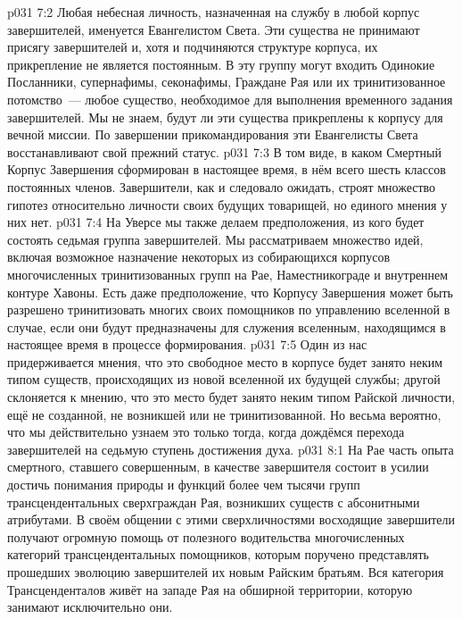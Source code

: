 \vs p031 7:2 Любая небесная личность, назначенная на службу в любой корпус завершителей, именуется Евангелистом Света. Эти существа не принимают присягу завершителей и, хотя и подчиняются структуре корпуса, их прикрепление не является постоянным. В эту группу могут входить Одинокие Посланники, супернафимы, секонафимы, Граждане Рая или их тринитизованное потомство~--- любое существо, необходимое для выполнения временного задания завершителей. Мы не знаем, будут ли эти существа прикреплены к корпусу для вечной миссии. По завершении прикомандирования эти Евангелисты Света восстанавливают свой прежний статус.
\vs p031 7:3 \pc В том виде, в каком Смертный Корпус Завершения сформирован в настоящее время, в нём всего шесть классов постоянных членов. Завершители, как и следовало ожидать, строят множество гипотез относительно личности своих будущих товарищей, но единого мнения у них нет.
\vs p031 7:4 На Уверсе мы также делаем предположения, из кого будет состоять седьмая группа завершителей. Мы рассматриваем множество идей, включая возможное назначение некоторых из собирающихся корпусов многочисленных тринитизованных групп на Рае, Наместникограде и внутреннем контуре Хавоны. Есть даже предположение, что Корпусу Завершения может быть разрешено тринитизовать многих своих помощников по управлению вселенной в случае, если они будут предназначены для служения вселенным, находящимся в настоящее время в процессе формирования.
\vs p031 7:5 Один из нас придерживается мнения, что это свободное место в корпусе будет занято неким типом существ, происходящих из новой вселенной их будущей службы; другой склоняется к мнению, что это место будет занято неким типом Райской личности, ещё не созданной, не возникшей или не тринитизованной. Но весьма вероятно, что мы действительно узнаем это только тогда, когда дождёмся перехода завершителей на седьмую ступень достижения духа.
\vs p031 8:1 На Рае часть опыта смертного, ставшего совершенным, в качестве завершителя состоит в усилии достичь понимания природы и функций более чем тысячи групп трансцендентальных сверхграждан Рая, возникших существ с абсонитными атрибутами. В своём общении с этими сверхличностями восходящие завершители получают огромную помощь от полезного водительства многочисленных категорий трансцендентальных помощников, которым поручено представлять прошедших эволюцию завершителей их новым Райским братьям. Вся категория Трансценденталов живёт на западе Рая на обширной территории, которую занимают исключительно они.
